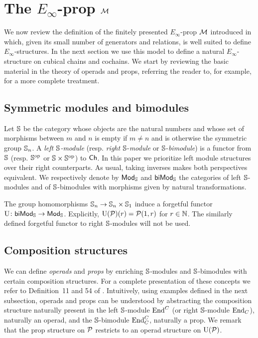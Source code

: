 
\section{The \texorpdfstring{$E_\infty$}{E-infty}-prop \texorpdfstring{$\M$}{M}} \label{s:operads and props}

We now review the definition of the finitely presented $E_\infty$-prop $\M$ introduced in \cite{medina2020prop1} which, given its small number of generators and relations, is well suited to define $E_\infty$-structures.
In the next section we use this model to define a natural $E_\infty$-structure on cubical chains and cochains.
We start by reviewing the basic material in the theory of operads and props, referring the reader to, for example, \cite{markl2008props} for a more complete treatment.

\subsection{Symmetric modules and bimodules}

Let $\S$ be the category whose objects are the natural numbers and whose set of morphisms between $m$ and $n$ is empty if $m \neq n$ and is otherwise the symmetric group $\S_n$.
A \textit{left $\S$-module} (resp. \textit{right} $\S$-\textit{module} or $\S$-\textit{bimodule}) is a functor from $\S$ (resp. $\S^\op$ or $\S \times \S^\op$) to $\Ch$.
In this paper we prioritize left module structures over their right counterparts.
As usual, taking inverses makes both perspectives equivalent.
We respectively denote by $\smod$ and $\sbimod$ the categories of left $\S$-modules and of $\S$-bimodules with morphisms given by natural transformations.

The group homomorphisms $\S_n \to \S_n \times \S_1$ induce a forgetful functor $\forget \colon \sbimod \to \smod$.
Explicitly, $\forget(\P)(r) = \P(1, r)$ for $r \in \N$.
The similarly defined forgetful functor to right $\S$-modules will not be used.

\subsection{Composition structures}

We can define \textit{operads} and \textit{props} by enriching $\S$-modules and $\S$-bimodules with certain composition structures.
For a complete presentation of these concepts we refer to Definition~11 and 54 of \cite{markl2008props}.
Intuitively, using examples defined in the next subsection, operads and props can be understood by abstracting the composition structure naturally present in the left $\S$-module $\End^C$ (or right $\S$-module $\End_C$), naturally an operad, and the $\S$-bimodule $\End^C_C$, naturally a prop.
We remark that the prop structure on $\P$ restricts to an operad structure on $\forget(\P)$.

